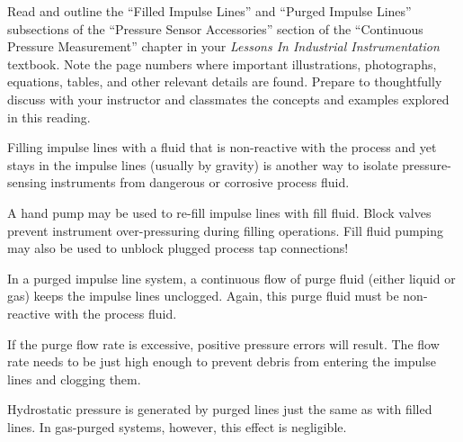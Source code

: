 

Read and outline the ``Filled Impulse Lines'' and ``Purged Impulse Lines'' subsections of the ``Pressure Sensor Accessories'' section of the ``Continuous Pressure Measurement'' chapter in your {\it Lessons In Industrial Instrumentation} textbook.  Note the page numbers where important illustrations, photographs, equations, tables, and other relevant details are found.  Prepare to thoughtfully discuss with your instructor and classmates the concepts and examples explored in this reading.















Filling impulse lines with a fluid that is non-reactive with the process and yet stays in the impulse lines (usually by gravity) is another way to isolate pressure-sensing instruments from dangerous or corrosive process fluid.  

\vskip 10pt

A hand pump may be used to re-fill impulse lines with fill fluid.  Block valves prevent instrument over-pressuring during filling operations.  Fill fluid pumping may also be used to unblock plugged process tap connections!

\vskip 10pt

In a purged impulse line system, a continuous flow of purge fluid (either liquid or gas) keeps the impulse lines unclogged.  Again, this purge fluid must be non-reactive with the process fluid.

\vskip 10pt

If the purge flow rate is excessive, positive pressure errors will result.  The flow rate needs to be just high enough to prevent debris from entering the impulse lines and clogging them.

\vskip 10pt

Hydrostatic pressure is generated by purged lines just the same as with filled lines.  In gas-purged systems, however, this effect is negligible.



